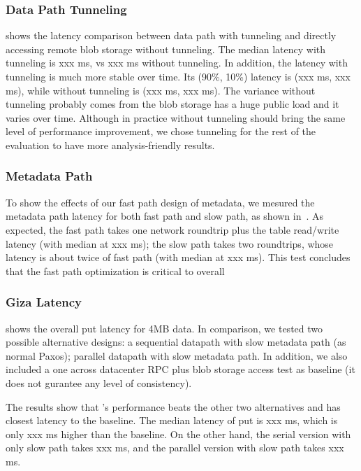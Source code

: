 \subsubsection{Data Path Tunneling}

 shows the latency comparison between data path with tunneling and 
directly accessing remote blob storage without tunneling. The median latency with tunneling 
is xxx ms, vs xxx ms without tunneling. In addition, the latency with tunneling is much 
more stable over time. Its (90\%, 10\%) latency is (xxx ms, xxx ms), while without tunneling 
is (xxx ms, xxx ms). The variance without tunneling probably comes from the blob storage 
has a huge public load and it varies over time. Although in practice \name without tunneling 
should bring the same level of performance improvement, we chose tunneling for the rest of 
the evaluation to have more analysis-friendly results.

\subsubsection{Metadata Path}

To show the effects of our fast path design of metadata, we mesured the metadata path latency 
for both fast path and slow path, as shown in~. As expected, the fast 
path takes one network roundtrip plus the table read/write latency (with median at xxx ms); 
the slow path takes two roundtrips, whose latency is about twice of fast path (with median at 
xxx ms). This test concludes that the fast path optimization is critical to \name overall 


\subsubsection{Giza Latency}

 shows the \name overall put latency for 4MB data. In comparison, 
we tested two possible alternative designs: a sequential datapath with slow metadata 
path (as normal Paxos); parallel datapath with slow metadata path. In addition, we also 
included a one across datacenter RPC plus blob storage access test as baseline (it does 
not gurantee any level of consistency).

The results show that \name's performance beats the other two alternatives and has closest
latency to the baseline. The median latency of \name put is xxx ms, which is only xxx ms
higher than the baseline. On the other hand, the serial version with only slow path takes 
xxx ms, and the parallel version with slow path takes xxx ms.

